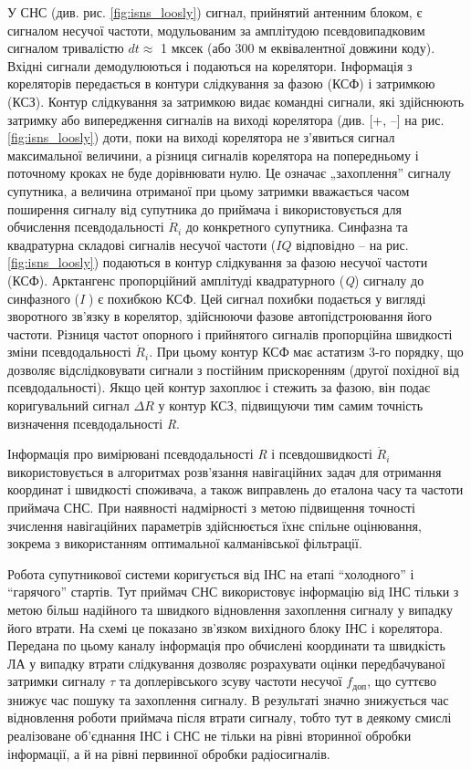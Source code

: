 У СНС  (див. рис. \ref{fig:isns_loosly}) сигнал, прийнятий антенним блоком, є сигналом несучої частоти,  
модульованим за амплітудою псевдовипадковим сигналом тривалістю  $dt \approx$ 1 мксек 
(або 300 м еквівалентної довжини коду). Вхідні сигнали демодулюються і подаються 
на корелятори.  Інформація з кореляторів передається в контури слідкування за фазою 
(КСФ) і затримкою (КСЗ). Контур слідкування за затримкою видає командні сигнали, 
які здійснюють  затримку або випередження сигналів на виході корелятора (див. [+, --] 
на рис. \ref{fig:isns_loosly}) доти, поки на виході корелятора не з'явиться сигнал максимальної величини, 
а різниця сигналів корелятора на попередньому і поточному кроках не буде дорівнювати 
нулю. Це означає „захоплення'' сигналу супутника, а величина отриманої при цьому 
затримки  вважається часом поширення сигналу від супутника до приймача і використовується 
для обчислення псевдодальності $\dot{R}_{i}$ до конкретного супутника. Синфазна та 
квадратурна складові сигналів несучої частоти ($IQ$ відповідно -- на рис. \ref{fig:isns_loosly}) 
подаються в контур слідкування за фазою несучої частоти (КСФ). Арктангенс 
пропорційний амплітуді квадратурного (\textit{Q}) сигналу до синфазного (\textit{I} ) 
є похибкою КСФ. Цей сигнал похибки подається у вигляді зворотного зв'язку в корелятор, 
здійснюючи фазове автопідстроювання його частоти. Різниця частот опорного і прийнятого 
сигналів пропорційна швидкості зміни псевдодальності  $\dot{R}_{i} $. При цьому
контур КСФ має астатизм 3-го порядку, що дозволяє відслідковувати 
сигнали з постійним прискоренням (другої похідної від псевдодальності). Якщо цей 
контур захоплює і стежить за фазою, він подає коригувальний сигнал $\Delta R$ у 
контур КСЗ, підвищуючи тим самим точність визначення псевдодальності \textit{R}. 

 Інформація 
про вимірювані псевдодальності \textit{R} і псевдошвидкості $\dot{R}_{i} $ використовується 
в алгоритмах розв'язання навігаційних задач для отримання координат і швидкості споживача, 
а також виправлень до еталона часу та частоти приймача СНС. При наявності надмірності 
з метою підвищення точності зчислення навігаційних параметрів здійснюється їхнє спільне 
оцінювання, зокрема з використанням оптимальної калманівської  фільтрації. 

Робота супутникової системи коригується від ІНС на етапі ``холодного'' і ``гарячого'' 
стартів. Тут приймач СНС використовує інформацію від ІНС тільки з метою 
більш надійного та швидкого відновлення захоплення сигналу у випадку його втрати. 
На схемі це показано зв'язком вихідного блоку ІНС і корелятора. Передана по цьому 
каналу інформація про обчислені координати та швидкість ЛА у випадку втрати слідкування 
дозволяє розрахувати оцінки передбачуваної затримки сигналу $\tau$ та доплерівського 
зсуву частоти несучої $f_{\text{доп}}$, що суттєво знижує час пошуку та захоплення сигналу. 
В результаті значно знижується час 
відновлення роботи приймача після втрати сигналу, тобто тут в деякому смислі реалізоване 
об'єднання ІНС і СНС не тільки на рівні вторинної обробки інформації, а й на рівні 
первинної обробки радіосигналів. 

